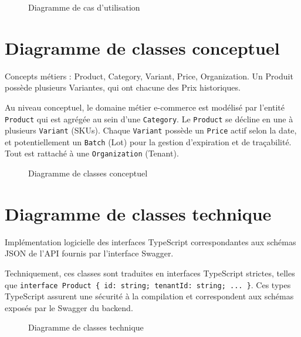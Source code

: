 \documentclass[12pt, a4paper]{report}
\begin{document}
\begin{figure}[h!]
    \centering
    \vspace{6cm} %
    \caption{Diagramme de cas d'utilisation}
    \label{fig:usecase}
\end{figure}

\section{Diagramme de classes conceptuel}
Concepts métiers : Product, Category, Variant, Price, Organization. Un Produit possède plusieurs Variantes, qui ont chacune des Prix historiques.

Au niveau conceptuel, le domaine métier e-commerce est modélisé par l'entité \texttt{Product} qui est agrégée au sein d'une \texttt{Category}. Le \texttt{Product} se décline en une à plusieurs \texttt{Variant} (SKUs). Chaque \texttt{Variant} possède un \texttt{Price} actif selon la date, et potentiellement un \texttt{Batch} (Lot) pour la gestion d'expiration et de traçabilité. Tout est rattaché à une \texttt{Organization} (Tenant).

\begin{figure}[h!]
    \centering
    \vspace{6cm} %
    \caption{Diagramme de classes conceptuel}
    \label{fig:classes_conceptuel}
\end{figure}

\section{Diagramme de classes technique}
Implémentation logicielle des interfaces TypeScript correspondantes aux schémas JSON de l'API fournis par l'interface Swagger.

Techniquement, ces classes sont traduites en interfaces TypeScript strictes, telles que \texttt{interface Product \{ id: string; tenantId: string; ... \}}. Ces types TypeScript assurent une sécurité à la compilation et correspondent aux schémas exposés par le Swagger du backend.

\begin{figure}[h!]
    \centering
    \vspace{6cm} %
    \caption{Diagramme de classes technique}
    \label{fig:classes_technique}
\end{figure}
\end{document}
